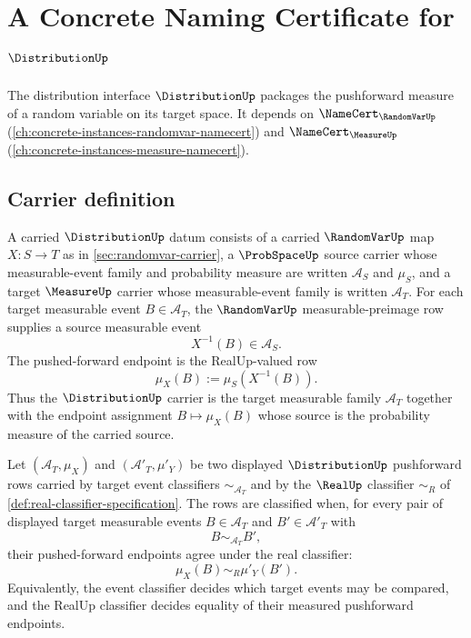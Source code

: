 \chapter{A Concrete Naming Certificate for $\DistributionUp$}
\label{ch:concrete-instances-distribution-namecert}

The distribution interface $\DistributionUp$ packages the pushforward measure of a random variable on its target space. It depends on $\NameCert_{\RandomVarUp}$ (\autoref{ch:concrete-instances-randomvar-namecert}) and $\NameCert_{\MeasureUp}$ (\autoref{ch:concrete-instances-measure-namecert}).

\section{Carrier definition}
\label{sec:distribution-carrier}

\begin{definition}
\label{def:distribution-pushforward-carrier}
A carried $\DistributionUp$ datum consists of a carried $\RandomVarUp$ map $X:S\to T$ as in \autoref{sec:randomvar-carrier}, a $\ProbSpaceUp$ source carrier whose measurable-event family and probability measure are written $\mathcal{A}_S$ and $\mu_S$, and a target $\MeasureUp$ carrier whose measurable-event family is written $\mathcal{A}_T$. For each target measurable event $B\in\mathcal{A}_T$, the $\RandomVarUp$ measurable-preimage row supplies a source measurable event
$$
X^{-1}(B)\in\mathcal{A}_S.
$$
The pushed-forward endpoint is the RealUp-valued row
$$
\mu_X(B):=\mu_S(X^{-1}(B)).
$$
Thus the $\DistributionUp$ carrier is the target measurable family $\mathcal{A}_T$ together with the endpoint assignment $B\mapsto\mu_X(B)$ whose source is the probability measure of the carried source.
\end{definition}

\begin{definition}
\label{def:distribution-pushforward-classifier}
Let $(\mathcal{A}_T,\mu_X)$ and $(\mathcal{A}'_T,\mu'_Y)$ be two displayed $\DistributionUp$ pushforward rows carried by target event classifiers $\sim_{\mathcal{A}_T}$ and by the $\RealUp$ classifier $\sim_R$ of \autoref{def:real-classifier-specification}. The rows are classified when, for every pair of displayed target measurable events $B\in\mathcal{A}_T$ and $B'\in\mathcal{A}'_T$ with
$$
B\sim_{\mathcal{A}_T}B',
$$
their pushed-forward endpoints agree under the real classifier:
$$
\mu_X(B)\sim_R\mu'_Y(B').
$$
Equivalently, the event classifier decides which target events may be compared, and the RealUp classifier decides equality of their measured pushforward endpoints.
\end{definition}


